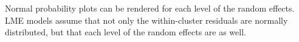 \documentclass[12pt, a4paper]{report}
\theoremstyle{plain}
\theoremstyle{definition}
\theoremstyle{remark}
\begin{document}
	Normal probability plots can be rendered for each level of the random effects.  LME models assume that not only the within-cluster residuals are normally distributed, but that each level of the random effects are as well. %
	
	
	
	
	
	
	
	
	
%	
%	
%
%	


%
\end{document}
